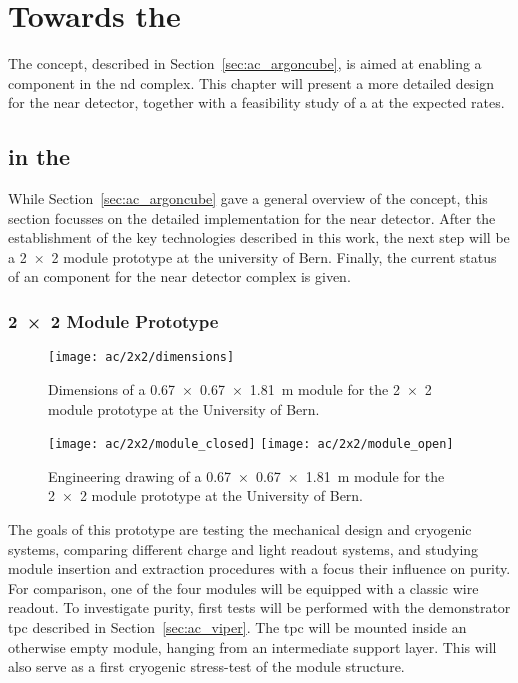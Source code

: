 \chapter{Towards the  }
\label{chap:dune-nd}

The \AC{} concept, described in Section~\ref{sec:ac_argoncube}, is aimed at enabling a \lartpc{} component in the \dune{} \gls{nd} complex.
This chapter will present a more detailed design for the near detector, together with a feasibility study of a \lartpc{} at the expected rates.


\section{\AC{} in the  }
\label{sec:dune-nd_ac}

While Section~\ref{sec:ac_argoncube} gave a general overview of the \AC{} concept, this section focusses on the detailed implementation for the \dune{} near detector.
After the establishment of the key technologies described in this work, the next step will be a \num{2 x 2} module prototype at the university of Bern.
Finally, the current status of an \AC{} \lartpc{} component for the \dune{} near detector complex is given.

\subsection{\num{2 x 2} Module Prototype}
\label{sec:dune-nd_ac_2x2}

\begin{figure}[htb]
	\centering
	\texttt{[image: ac/2x2/dimensions]}
	\caption{Dimensions of a \SI{0.67 x 0.67 x 1.81}{\metre} module for the \AC{} \num{2 x 2} module \AC{} prototype at the University of Bern.}
	\label{fig:2x2_dim}
\end{figure}

\begin{figure}[htb]
	\centering
	\texttt{[image: ac/2x2/module\_closed]}
	\texttt{[image: ac/2x2/module\_open]}
	\caption{Engineering drawing of a \SI{0.67 x 0.67 x 1.81}{\metre} module for the \AC{} \num{2 x 2} module \AC{} prototype at the University of Bern.}
	\label{fig:2x2_mod}
\end{figure}

The goals of this prototype are testing the mechanical design and cryogenic systems, comparing different charge and light readout systems, and studying module insertion and extraction procedures with a focus their influence on purity.
For comparison, one of the four modules will be equipped with a classic wire readout.
To investigate purity, first tests will be performed with the \AC{} demonstrator \gls{tpc} described in Section~\ref{sec:ac_viper}.
The \gls{tpc} will be mounted inside an otherwise empty module, hanging from an intermediate support layer.
This will also serve as a first cryogenic stress-test of the module structure.

